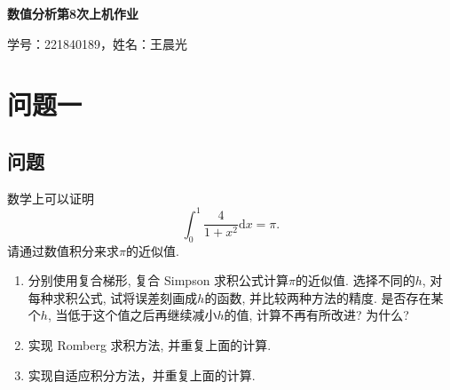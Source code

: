\documentclass[UTF8,ctexart,a4paper,11pt,openany]{article}
\theoremstyle{definition}
\begin{document}
\begin{center}
{\huge \textbf{数值分析第8次上机作业}}

{\large 学号：221840189，姓名：王晨光}
\end{center}

\section{问题一}
    \subsection{问题}
    数学上可以证明$$\int_{0}^{1}\frac{4}{1+x^2} \mathrm{d}x = \pi .$$
    请通过数值积分来求$\pi$的近似值.
    \begin{enumerate}
        \item 分别使用复合梯形, 复合 Simpson 求积公式计算$\pi$的近似值. 选择不同的$h$, 对每种求积公式, 试将误差刻画成$h$的函数, 并比较两种方法的精度. 是否存在某个$h$, 当低于这个值之后再继续减小$h$的值, 计算不再有所改进? 为什么?
        \item 实现 Romberg 求积方法, 并重复上面的计算.
        \item 实现自适应积分方法，并重复上面的计算.
    \end{enumerate}
\end{document}
